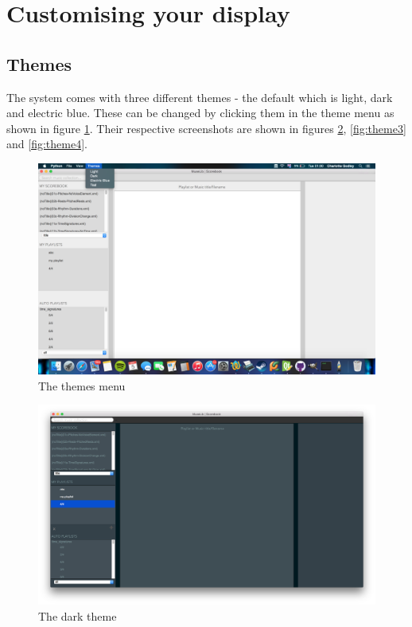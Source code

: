 \section{Customising your display}
\subsection{Themes}
The system comes with three different themes - the default which is light, dark and electric blue. These can be changed by clicking them in the theme menu as shown in figure \ref{fig:themes}. Their respective screenshots are shown in figures \ref{fig:theme2}, \ref{fig:theme3} and \ref{fig:theme4}.
\begin{figure}[H]
\centering
\includegraphics[width=500pt]{theme}
\caption{The themes menu}
\label{fig:themes}	
\end{figure}


\begin{figure}[H]
\centering
\includegraphics[width=400pt]{main_dark}
\caption{The dark theme}
\label{fig:theme2}	
\end{figure}

